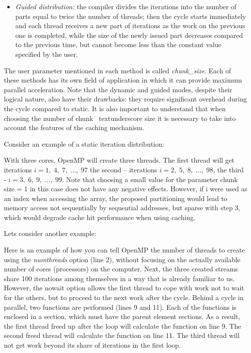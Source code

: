 {\begin{itemize}
		\item\textit{Guided distribution:} the compiler divides the iterations into the number of parts equal to twice the number of threads; then the cycle starts immediately and each thread receives a new part of iterations as the work on the previous one is completed, while the size of the newly issued part decreases compared to the previous time, but cannot become less than the constant value specified by the user.
	\end{itemize}
	\par The user parameter mentioned in each method is called  \textit{chunk\_size}. Each of these methods has its own field of application in which it can provide maximum parallel acceleration. Note that the dynamic and guided modes, despite their logical nature, also have their drawbacks: they require significant overhead during the cycle compared to static. It is also important to understand that when choosing the number of chunk \ textunderscore size it is necessary to take into account the features of the caching mechanism.
	\par Consider an example of a static iteration distribution:
	\begin{figure}[H]
		
	\end{figure}
	\par With three cores, OpenMP will create three threads. The first thread will get iterations $i=1,\;4,\;7,\;…,\;97$ the second – iterations $i=2,\;5,\;8,\;…,\;98$, the third -  $i=3,\;6,\;9,\;…,\;99$. Note that choosing a small value for the parameter chunk \textunderscore size = 1 in this case does not have any negative effects. However, if i were used as an index when accessing the array, the proposed partitioning would lead to memory access not sequentially by sequential addresses, but sparse with step 3, which would degrade cache hit performance when using caching.
	\par Lets consider another example: 
	\begin{figure}[H]
		
	\end{figure}
	\par Here is an example of how you can tell OpenMP the number of threads to create using the \textit{num\textunderscore threads} option (line 2), without focusing on the actually available number of cores (processors) on the computer. Next, the three created streams share 100 iterations among themselves in a way that is already familiar to us. However, the nowait option allows the first thread to cope with work not to wait for the others, but to proceed to the next work after the cycle. Behind a cycle in parallel, two functions are performed (lines 9 and 11). Each of the functions is enclosed in a section, which must have the parent element sections. As a result, the first thread freed up after the loop will calculate the function on line 9. The second freed thread will calculate the function on line 11. The third thread will not get work beyond its share of iterations in the first loop.
}
